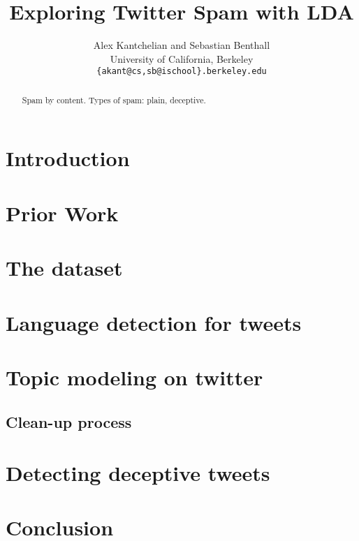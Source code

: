 \documentclass[times, 11pt, twocolumn]{article}
\begin{document}
\title{Exploring Twitter Spam with LDA}
\author{Alex Kantchelian and Sebastian Benthall \\
University of California, Berkeley \\
 \texttt{\{akant@cs,sb@ischool\}.berkeley.edu}\\
 }
 \date{}

\maketitle

\begin{abstract}
	Spam by content. Types of spam: plain, deceptive.
\end{abstract}

\section{Introduction}

\section{Prior Work}

\section{The dataset}

\section{Language detection for tweets}

\section{Topic modeling on twitter}
\subsection{Clean-up process}

\section{Detecting deceptive tweets}

\section{Conclusion}
\end{document}
